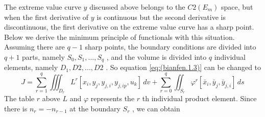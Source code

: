 The extreme value curve $ y$  discussed above belongs to the $ C2 (E_m) $ space, but when the first derivative of $ y$  is continuous but the second derivative is discontinuous, the first derivative on the extreme value curve has a sharp point. Below we derive the minimum principle of functionals with this situation.
Assuming there are $ q-1 $ sharp points, the boundary conditions are divided into $ q+1 $ parts, namely $ S_0, S_1,..., S_q $ , and the volume is divided into $ q $ individual elements, namely $ D_1, D2,..., D2 $ . So equation \ref{eq:(bianfen.1.3)} can be changed to
\begin{equation}\label{eq:(bianfen.2.1)}
J = \sum_{r=1}^{q}\iiint_{D_r} L^{r}[x_i,y_j,y_{j,i},y_{j,ip},u_k] \,dv + \sum_{r=0}^{q}\iint_{S_r} \varphi^{r}[\bar {x}_i ,\bar {y}_j ,\bar {y}_ {j,i}] \,ds
\end{equation}
The table $ r $ above $ L$  and $ \varphi $ represents the $ r $ th individual product element. Since there is $ n_r=- n_ {r-1}$  at the boundary $ S_r $ , we can obtain
